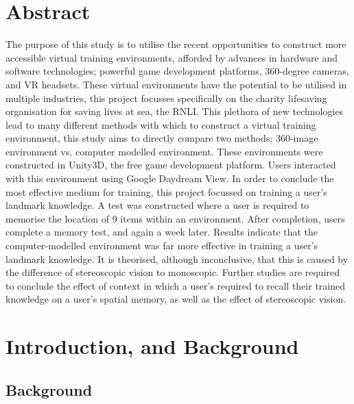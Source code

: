 \documentclass[ %
                    author={Elis Jones},
                supervisor={Dr. Kirsten Cater},
                    degree={BSc},
                     title={The Effect of Presentation Medium on Spatial Cognition},
                  subtitle={in the Virtual Environment},
                      year={2018} ]{dissertation}
\date{}
\begin{document}

\maketitle
\frontmatter
\makedecl



\tableofcontents{}

\chapter*{Abstract}
The purpose of this study is to utilise the recent opportunities to construct more accessible virtual training environments, afforded by advances in hardware and software technologies; powerful game development platforms, 360-degree cameras, and VR headsets. These virtual environments have the potential to be utilised in multiple industries, this project focusses specifically on the charity lifesaving organisation for saving lives at sea, the RNLI. This plethora of new technologies lead to many different methods with which to construct a virtual training environment, this study aims to directly compare two methods; 360-image environment vs. computer modelled environment. These environments were constructed in Unity3D, the free game development platform. Users interacted with this environment using Google Daydream View. In order to conclude the most effective medium for training, this project focussed on training a user's landmark knowledge. A test was constructed where a user is required to memorise the location of 9 items within an environment. After completion, users complete a memory test, and again a week later. Results indicate that the computer-modelled environment was far more effective in training a user's landmark knowledge. It is theorised, although inconclusive, that this is caused by the difference of stereoscopic vision to monoscopic. Further studies are required to conclude the effect of context in which a user's required to recall their trained knowledge on a user's spatial memory, as well as the effect of stereoscopic vision.  

\mainmatter
\chapter{Introduction, and Background}\label{intro_chapter}
\section{Background}
\end{document}
